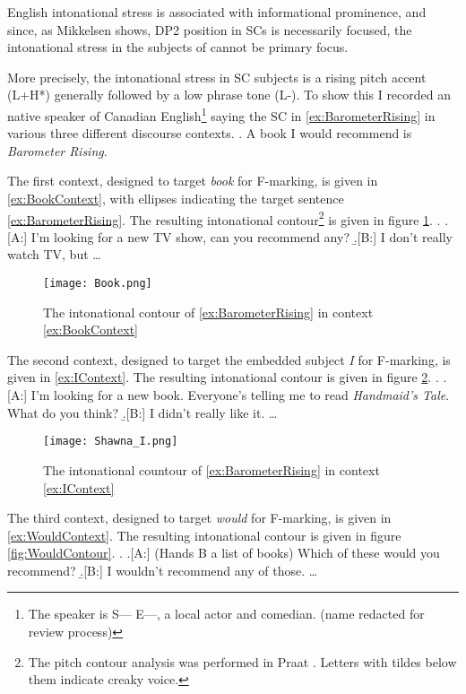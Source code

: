 \documentclass[letterpaper]{article}
\begin{document}
English intonational stress is associated with informational prominence, and since, as Mikkelsen shows, DP2 position in SCs is necessarily focused, the intonational stress in the subjects of \Last cannot be primary focus.

More precisely, the intonational stress in SC subjects is a rising pitch accent (L+H*) generally followed by a low phrase tone (L-).
To show this I recorded an native speaker of Canadian English\footnote{
	The speaker is  S--- E---, a local actor and comedian. (name redacted for review process)
} saying the SC in \ref{ex:BarometerRising} in various three different discourse contexts.
\ex. \label{ex:BarometerRising} A book I would recommend is \textit{Barometer Rising}.

The first context, designed to target \textit{book} for F-marking, is given in \ref{ex:BookContext}, with ellipses indicating the target sentence \ref{ex:BarometerRising}.
The resulting intonational contour\footnote{
	The pitch contour analysis was performed in Praat \parencite{praat}.
	Letters with tildes below them indicate creaky voice.
} is given in figure \ref{fig:BookContour}.
\ex.\label{ex:BookContext}
\a.[A:] I'm looking for a new TV show, can you recommend any?
\b.[B:] I don't really watch TV, but \dots

\begin{figure}[h]
	\centering
	\texttt{[image: Book.png]}
	\caption{The intonational contour of \ref{ex:BarometerRising} in context \ref{ex:BookContext}}
	\label{fig:BookContour}
\end{figure}
\FloatBarrier
The second context, designed to target the embedded subject \textit{I} for F-marking, is given in \ref{ex:IContext}.
The resulting intonational contour is given in figure \ref{fig:IContour}.
\ex.\label{ex:IContext}
\a.[A:] I'm looking for a new book. Everyone's telling me to read \textit{Handmaid's Tale}. What do you think?
\b.[B:] I didn't really like it. \dots

\begin{figure}[h]
	\centering
	\texttt{[image: Shawna\_I.png]}
	\caption{The intonational countour of \ref{ex:BarometerRising} in context \ref{ex:IContext}}
	\label{fig:IContour}
\end{figure}
\FloatBarrier
The third context, designed to target \textit{would} for F-marking, is given in \ref{ex:WouldContext}.
The resulting intonational contour is given in figure \ref{fig:WouldContour}.
\ex.\label{ex:WouldContext}
\a.[A:] (Hands B a list of books) Which of these would you recommend?
\b.[B:] I wouldn't recommend any of those. \dots
\end{document}
